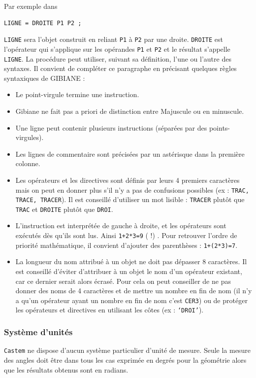 \documentclass[a4paper,multicol]{article}
\begin{document}
Par exemple dans
\begin{verbatim}
LIGNE = DROITE P1 P2 ;
\end{verbatim}
{\tt LIGNE} sera l'objet construit en reliant {\tt P1} à {\tt P2} par une droite. {\tt DROITE} est l'opérateur qui s'applique sur les opérandes {\tt P1} et {\tt P2} et le résultat s'appelle {\tt LIGNE}. La procédure peut utiliser,
suivant sa définition, l'une ou l'autre des syntaxes. Il convient de compléter ce paragraphe en
précisant quelques règles syntaxiques de GIBIANE :
\begin{itemize}
\item Le point-virgule termine une instruction.
\item  Gibiane ne fait pas a priori de distinction entre Majuscule ou en minuscule. 
\item  Une ligne peut contenir plusieurs instructions (séparées par des points-virgules).
\item  Les lignes de commentaire sont précisées par un astérisque dans la première colonne.
\item  Les opérateurs et les directives sont définis par leurs 4 premiers caractères mais on
peut en donner plus s'il n'y a pas de confusions possibles (ex : {\tt TRAC, TRACE, TRACER}).
Il est conseillé d'utiliser un mot lisible :
{\tt TRACER} plutôt que {\tt TRAC} et {\tt DROITE} plutôt que {\tt DROI}.
\item  L'instruction est interprétée de gauche à droite, et les opérateurs sont exécutés dès
qu'ils sont lus. Ainsi {\tt 1+2*3=9} ( !) . Pour retrouver l'ordre de priorité mathématique,
il convient d'ajouter des parenthèses : {\tt 1+(2*3)=7}.
\item  La longueur du nom attribué à un objet ne doit pas dépasser 8 caractères.
Il est conseillé d'éviter d'attribuer à un objet le nom d'un opérateur existant, car ce dernier
serait alors écrasé. Pour cela on peut conseiller de ne pas donner des noms de 4 caractères et
de mettre un nombre en fin de nom (il n'y a qu'un opérateur ayant un nombre en fin de nom c'est {\tt CER3}) ou de protéger les opérateurs et directives en utilisant les côtes (ex : {\tt ‘DROI'}).
\end{itemize}
\subsubsection*{Système d'unités}
{\tt Castem} ne dispose d'aucun système particulier d'unité de mesure. 
Seule la mesure des angles doit être dans tous les cas exprimée en degrés pour la géométrie
alors que  les résultats obtenus sont en radians.
\end{document}
